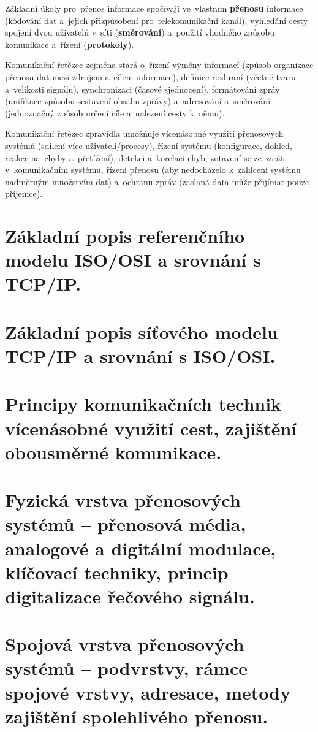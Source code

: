 Základní úkoly pro~přenos informace spočívají ve~vlastním \textbf{přenosu} informace (kódování dat a~jejich přizpůsobení pro~telekomunikační kanál), vyhledání cesty spojení dvou uživatelů v~síti (\textbf{směrování}) a~použití vhodného způsobu komunikace a~řízení (\textbf{protokoly}).

Komunikační řetězec zejména stará o~řízení výměny informací (způsob organizace přenosu dat mezi zdrojem a~cílem informace), definice rozhraní (včetně tvaru a~velikosti signálu), synchronizaci (časové sjednocení), formátování zpráv (unifikace způsobu sestavení obsahu zprávy) a~adresování a~směrování (jednoznačný způsob určení cíle a~nalezení cesty k~němu).

Komunikační řetězec zpravidla umožňuje vícenásobné využití přenosových systémů (sdílení více uživateli/procesy), řízení systému (konfigurace, dohled, reakce na~chyby a~přetížení), detekci a~korelaci chyb, zotavení se ze~ztrát v~komunikačním systému, řízení přenosu (aby nedocházelo k~zahlcení systému nadměrným množstvím dat) a~ochranu zpráv (zaslaná data může přijímat pouze příjemce).

\clearpage
\section{Základní popis referenčního modelu ISO/OSI a srovnání s TCP/IP.}

\clearpage
\section{Základní popis síťového modelu TCP/IP a srovnání s ISO/OSI.}

\clearpage
\section{Principy komunikačních technik -- vícenásobné využití cest, zajištění obousměrné komunikace.}

\clearpage
\section{Fyzická vrstva přenosových systémů -- přenosová média, analogové a digitální modulace, klíčovací techniky, princip digitalizace řečového signálu.}

\clearpage
\section{Spojová vrstva přenosových systémů -- podvrstvy, rámce spojové vrstvy, adresace, metody zajištění spolehlivého přenosu.}

